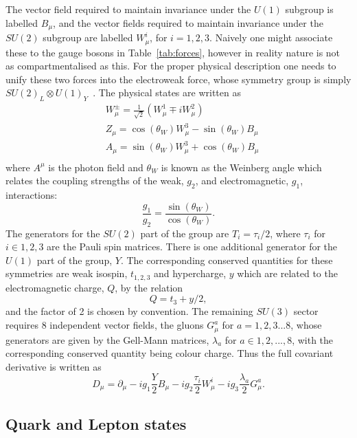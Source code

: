The vector field required to maintain invariance under the $U(1)$ subgroup is labelled $B_{\mu}$, and the vector fields required to maintain invariance under the $SU(2)$ subgroup are labelled $W^{i}_{\mu}$, for $i=1,2,3$. Naively one might associate these to the \SM gauge bosons in Table~\ref{tab:forces}, however in reality nature is not as compartmentalised as this. For the proper physical description one needs to unify these two forces into the electroweak force, whose symmetry group is simply $SU(2)_{L}\otimes U(1)_{Y}$~\cite{Glashow,Weinberg,Salam}.  The physical states are written as
\begin{align}
  & W_{\mu}^{\pm} = \frac{1}{\sqrt{2}}(W^{1}_{\mu}\mp iW^{2}_{\mu})\\
  & Z_{\mu} = \cos(\theta_{W})W^{3}_{\mu}-\sin(\theta_{W})B_{\mu}\\
  & A_{\mu} = \sin(\theta_{W})W^{3}_{\mu}+\cos(\theta_{W})B_{\mu}\\
\end{align}
where $A^{\mu}$ is the photon field and $\theta_{W}$ is known as the Weinberg angle which relates the coupling strengths of the weak, $g_{2}$, and electromagnetic, $g_{1}$, interactions:
\begin{equation}
  \frac{g_{1}}{g_{2}} = \frac{\sin(\theta_{W})}{\cos(\theta_{W})}.
\end{equation}
The generators for the $SU(2)$ part of the group are $T_{i}=\tau_{i}/2$, where $\tau_{i}$ for $i\in{1,2,3}$ are the Pauli spin matrices. There is one additional generator for the $U(1)$ part of the group, $Y$. The corresponding conserved quantities for these symmetries are weak isospin, $t_{1,2,3}$ and hypercharge, $y$ which are related to the electromagnetic charge, $Q$, by the relation
\begin{equation}
  Q = t_{3}+y/2,
\end{equation}
 and the factor of 2 is chosen by convention. The remaining $SU(3)$ sector requires 8 independent vector fields, the gluons $G_{\mu}^{a}$ for $a=1,2,3...8$, whose generators are given by the Gell-Mann matrices, $\lambda_{a}$ for $a\in{1,2,...,8}$, with the corresponding conserved quantity being colour charge. Thus the full covariant derivative is written as
\begin{equation}
  D_{\mu} = \partial_{\mu}-ig_{1}\frac{Y}{2}B_{\mu} -ig_{2}\frac{\tau_{i}}{2}W_{\mu}^{i} -ig_{3}\frac{\lambda_{a}}{2}G_{\mu}^{a}.
  \label{eq:cov_der}
\end{equation}

\subsection{Quark and Lepton states}

